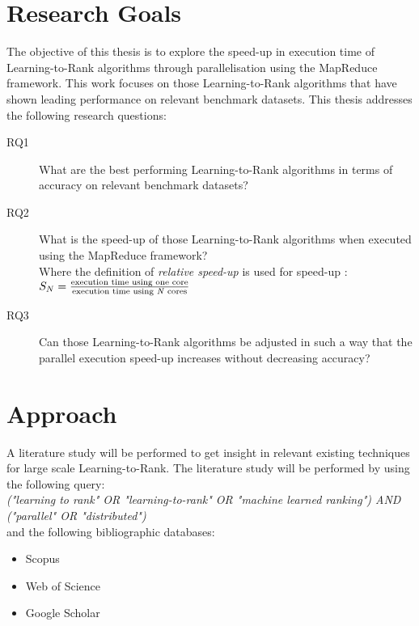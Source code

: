 \section{Research Goals}
\label{sec:goals}
The objective of this thesis is to explore the speed-up in execution time of Learning-to-Rank algorithms through parallelisation using the MapReduce framework.
This work focuses on those Learning-to-Rank algorithms that have shown leading performance on relevant benchmark datasets.
This thesis addresses the following research questions:
\begin{description}
\item[RQ1] What are the best performing Learning-to-Rank algorithms in terms of accuracy on relevant benchmark datasets?\\

\item[RQ2] What is the speed-up of those Learning-to-Rank algorithms when executed using the MapReduce framework?\\
Where the definition of \emph{relative speed-up} is used for speed-up \cite{Sun1991}:\\

$S_N = \frac{\text{execution time using one core}}{\text{execution time using \emph{N} cores}}$

\item[RQ3] Can those Learning-to-Rank algorithms be adjusted in such a way that the parallel execution speed-up increases without decreasing accuracy?
\end{description}

\section{Approach}
A literature study will be performed to get insight in relevant existing techniques for large scale Learning-to-Rank. The literature study will be performed by using the following query:\\

\emph{("learning to rank" \emph{OR} "learning-to-rank" \emph{OR} "machine learned ranking") \emph{AND} ("parallel" \emph{OR} "distributed")}\\

and the following bibliographic databases:
\begin{itemize}
\item Scopus
\item Web of Science
\item Google Scholar
\end{itemize}


